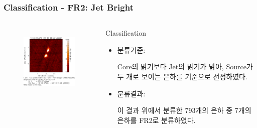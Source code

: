 \documentclass[xcolor={dvipsnames,table}]{beamer}
\newcommand\SM{\fontsize{8}{7.2}\selectfont}
\begin{document}
\begin{frame}
  \frametitle{Classification - FR2: Jet Bright}
  \SM
  \begin{columns}
   \begin{figure}
    \centering
    \includegraphics[width=5cm, height=3.5cm]{jet.png}
   \end{figure}
   \centering
   \begin{block}{Classification}
    \begin{itemize}
     \item 분류기준:
     
     Core의 밝기보다 Jet의 밝기가 밝아, Source가 두 개로 보이는 은하를 기준으로 선정하였다.
     \vspace{0.2cm}
     \item 분류결과:
     
     이 결과 위에서 분류한 793개의 은하 중 7개의 은하를 FR2로 분류하였다.

    \end{itemize}
   \end{block}
  \end{columns}
  \vspace{0.2cm}
\end{frame}
\end{document}
